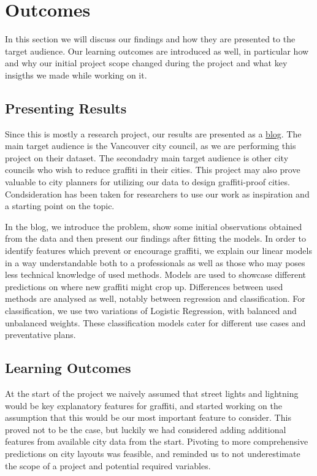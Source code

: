\chapter{Outcomes}
In this section we will discuss our findings and how they are presented to the target audience. Our learning outcomes are introduced as well, in particular how and why our initial project scope changed during the project and what key insigths we made while working on it.

\section{Presenting Results}

Since this is mostly a research project, our results are presented as a \href{https://cowkeyman.github.io/PredictingGraffitiUsingCityLayouts/}{blog}. The main target audience is the Vancouver city council, as we are performing this project on their dataset. The secondadry main target audience is other city councils who wish to reduce graffiti in their cities. This project may also prove valuable to city planners for utilizing our data to design graffiti-proof cities. Condsideration has been taken for researchers to use our work as inspiration and a starting point on the topic.

In the blog, we introduce the problem, show some initial observations obtained from the data and then present our findings after fitting the models. In order to identify features which prevent or encourage graffiti, we explain our linear models in a way understandable both to a professionals as well as those who may poses less technical knowledge of used methods. Models are used to showcase different predictions on where new graffiti might crop up. Differences between used methods are analysed as well, notably between regression and classification. For classification, we use two variations of Logistic Regression, with balanced and unbalanced weights. These classification models cater for different use cases and preventative plans.

\section{Learning Outcomes} %
At the start of the project we naively assumed that street lights and lightning would be key explanatory features for graffiti, and started working on the assumption that this would be our most important feature to consider. This proved not to be the case, but luckily we had considered adding additional features from available city data from the start. Pivoting to more comprehensive predictions on city layouts was feasible, and reminded us to not underestimate the scope of a project and potential required variables.

